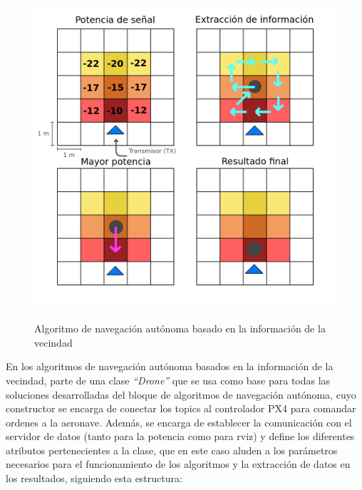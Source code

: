 \begin{figure} [tp]
    \begin{center}
    \includegraphics[height=12cm]{imagenes/cap4/9_algoritmo_manual.png}
    \end{center}
    \caption[Algoritmo de navegación autónoma basado en la información de la vecindad]{Algoritmo de navegación autónoma basado en la información de la vecindad}
    \label{fig:manual_algorithm}
\end{figure}

En los algoritmos de navegación autónoma basados en la información de la vecindad, parte de una clase \emph{``Drone''} que se usa como base para todas las soluciones desarrolladas del bloque de algoritmos de navegación autónoma, cuyo constructor se encarga de conectar los topics al controlador PX4 para comandar ordenes a la aeronave. Además, se encarga de establecer la comunicación con el servidor de datos (tanto para la potencia como para rviz) y define los diferentes atributos pertenecientes a la clase, que en este caso aluden a los parámetros necesarios para el funcionamiento de los algoritmos y la extracción de datos en los resultados, siguiendo esta estructura:

